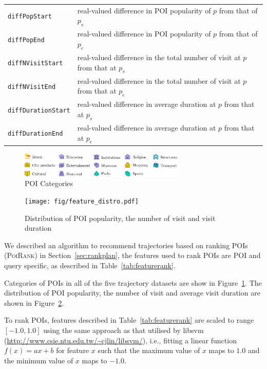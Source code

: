 \begin{table}[ht]
\begin{tabular}{l|l}
\texttt{diffPopStart}           & real-valued difference in POI popularity of $p$ from that of $p_s$ \\
\texttt{diffPopEnd}             & real-valued difference in POI popularity of $p$ from that of $p_e$ \\
\texttt{diffNVisitStart}        & real-valued difference in the total number of visit at $p$ from that at $p_s$ \\
\texttt{diffNVisitEnd}          & real-valued difference in the total number of visit at $p$ from that at $p_e$ \\
\texttt{diffDurationStart}      & real-valued difference in average duration at $p$ from that at $p_s$ \\
\texttt{diffDurationEnd}        & real-valued difference in average duration at $p$ from that at $p_e$ \\ \hline
\end{tabular}
\end{table}


\begin{figure}[ht]
	\centering
	\includegraphics[width=0.7\textwidth]{fig/poi_cats_fat.pdf}
	\caption{POI Categories}
	\label{fig:poicats}
\end{figure}


\begin{figure}[t]
\texttt{[image: fig/feature\_distro.pdf]}
\caption{Distribution of POI popularity, the number of visit and visit duration}
\label{fig:distro}\captionmoveup
\end{figure}



We described an algorithm to recommend trajectories based on ranking POIs (\textsc{PoiRank}) in Section~\ref{sec:rankplan},
the features used to rank POIs are POI and query specific, as described in Table~\ref{tab:featurerank}.

Categories of POIs in all of the five trajectory datasets are show in Figure~\ref{fig:poicats}.
The distribution of POI popularity, the number of visit and average visit duration are shown in Figure~\ref{fig:distro}.

To rank POIs, features described in Table~\ref{tab:featurerank} are scaled to range $[-1.0, 1.0]$ using the same approach
as that utilised by libsvm (\url{http://www.csie.ntu.edu.tw/~cjlin/libsvm/}),
i.e., fitting a linear function $f(x) = a x + b$ for feature $x$ such that the maximum value of $x$ maps to $1.0$
and the minimum value of $x$ maps to $-1.0$.



